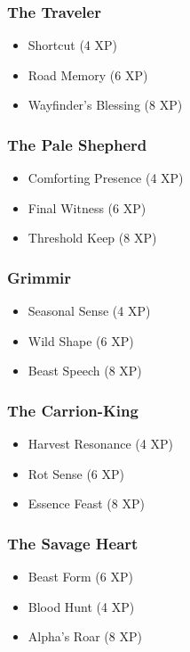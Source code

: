\subsubsection{The Traveler}
\begin{itemize}
\item Shortcut (4 XP)
\item Road Memory (6 XP)
\item Wayfinder's Blessing (8 XP)
\end{itemize}

\subsubsection{The Pale Shepherd}
\begin{itemize}
\item Comforting Presence (4 XP)
\item Final Witness (6 XP)
\item Threshold Keep (8 XP)
\end{itemize}

\subsubsection{Grimmir}
\begin{itemize}
\item Seasonal Sense (4 XP)
\item Wild Shape (6 XP)
\item Beast Speech (8 XP)
\end{itemize}

\subsubsection{The Carrion-King}
\begin{itemize}
\item Harvest Resonance (4 XP)
\item Rot Sense (6 XP)
\item Essence Feast (8 XP)
\end{itemize}

\subsubsection{The Savage Heart}
\begin{itemize}
\item Beast Form (6 XP)
\item Blood Hunt (4 XP)
\item Alpha's Roar (8 XP)
\end{itemize}

